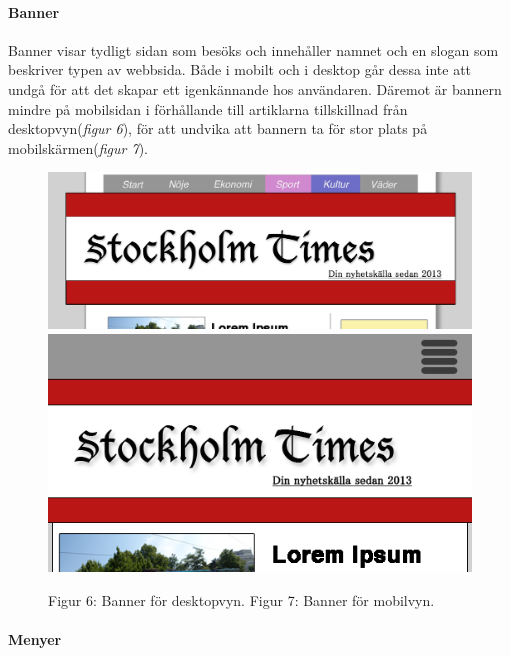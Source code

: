 \documentclass[11pt]{article}
\begin{document}
\paragraph{Banner}\mbox{}

Banner visar tydligt sidan som besöks och innehåller namnet och en slogan som beskriver typen av webbsida. Både i mobilt och i desktop går dessa inte att undgå för att det skapar ett igenkännande hos användaren. Däremot är bannern mindre på mobilsidan i förhållande till artiklarna tillskillnad från desktopvyn(\textit{figur 6}), för att undvika att bannern ta för stor plats på mobilskärmen(\textit{figur 7}).
\\
\begin{figure}[H]
\centerline{%
\includegraphics[scale=0.258]{pics/bannerdesktop.png}\hspace{2em}%
\includegraphics[scale=0.40]{pics/bannermobil.png}%
}
\vspace{0.3cm}
\hspace{0.15cm}Figur 6: Banner för desktopvyn.\hspace{4.4cm} Figur 7: Banner för mobilvyn.

\end{figure}

\paragraph{Menyer}\mbox{}
\end{document}
